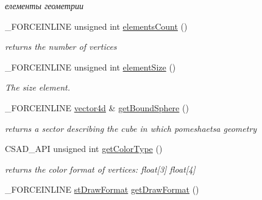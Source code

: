 \begin{DoxyCompactItemize}
\begin{DoxyCompactList}\small\item\em елементы геометрии \end{DoxyCompactList}\item 
\hypertarget{classcsad_1_1_mesh_accd0743abe213e3db30405443e69e149}{\-\_\-\-F\-O\-R\-C\-E\-I\-N\-L\-I\-N\-E unsigned int \hyperlink{classcsad_1_1_mesh_accd0743abe213e3db30405443e69e149}{elements\-Count} ()}\label{classcsad_1_1_mesh_accd0743abe213e3db30405443e69e149}

\begin{DoxyCompactList}\small\item\em returns the number of vertices \end{DoxyCompactList}\item 
\hypertarget{classcsad_1_1_mesh_a493f5dd55fd78c7cb80c1f53277e277d}{\-\_\-\-F\-O\-R\-C\-E\-I\-N\-L\-I\-N\-E unsigned int \hyperlink{classcsad_1_1_mesh_a493f5dd55fd78c7cb80c1f53277e277d}{element\-Size} ()}\label{classcsad_1_1_mesh_a493f5dd55fd78c7cb80c1f53277e277d}

\begin{DoxyCompactList}\small\item\em The size element. \end{DoxyCompactList}\item 
\hypertarget{classcsad_1_1_mesh_abe06cc3e046a6ae3d1bac6b166c2138d}{\-\_\-\-F\-O\-R\-C\-E\-I\-N\-L\-I\-N\-E \hyperlink{classbt_1_1vector4d}{vector4d} \& \hyperlink{classcsad_1_1_mesh_abe06cc3e046a6ae3d1bac6b166c2138d}{get\-Bound\-Sphere} ()}\label{classcsad_1_1_mesh_abe06cc3e046a6ae3d1bac6b166c2138d}

\begin{DoxyCompactList}\small\item\em returns a sector describing the cube in which pomeshaetsa geometry \end{DoxyCompactList}\item 
\hypertarget{classcsad_1_1_mesh_a76ec45b40a52b20976ac300fc1442b2d}{C\-S\-A\-D\-\_\-\-A\-P\-I unsigned int \hyperlink{classcsad_1_1_mesh_a76ec45b40a52b20976ac300fc1442b2d}{get\-Color\-Type} ()}\label{classcsad_1_1_mesh_a76ec45b40a52b20976ac300fc1442b2d}

\begin{DoxyCompactList}\small\item\em returns the color format of vertices\-: float\mbox{[}3\mbox{]} float\mbox{[}4\mbox{]} \end{DoxyCompactList}\item 
\hypertarget{classcsad_1_1_mesh_a92ec16d29adf1cb482510b6e9afec6af}{\-\_\-\-F\-O\-R\-C\-E\-I\-N\-L\-I\-N\-E \hyperlink{classcsad_1_1_mesh_a0992cfc5c22b440ba3db818112d69caf}{st\-Draw\-Format} \hyperlink{classcsad_1_1_mesh_a92ec16d29adf1cb482510b6e9afec6af}{get\-Draw\-Format} ()}\label{classcsad_1_1_mesh_a92ec16d29adf1cb482510b6e9afec6af}


\end{DoxyCompactItemize}
